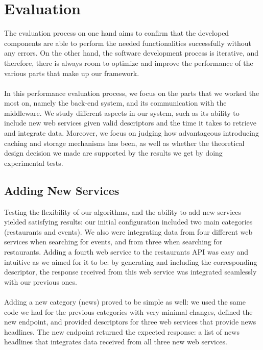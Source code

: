 \begin{itemize}
\end{itemize}
\pagebreak
\section{Evaluation}
The evaluation process on one hand aims to confirm that the developed components are able to perform the needed functionalities successfully without any errors. On the other hand, the software development process is iterative, and therefore, there is always room to optimize and improve the performance of the various parts that make up our framework.\\\\
In this performance evaluation process, we focus on the parts that we worked the most on, namely the back-end system, and its communication with the middleware. We study different aspects in our system, such as its ability to include new web services given valid descriptors and the time it takes to retrieve and integrate data. Moreover, we focus on judging how advantageous introducing caching and storage mechanisms has been, as well as whether the theoretical design decision we made are supported by the results we get by doing experimental tests.
\subsection{Adding New Services}
Testing the flexibility of our algorithms, and the ability to add new services yielded satisfying results: our initial configuration included two main categories (restaurants and events). We also were integrating data from four different web services when searching for events, and from three when searching for restaurants. Adding a fourth web service to the restaurants API was easy and intuitive as we aimed for it to be: by generating and including the corresponding descriptor, the response received from this web service was integrated seamlessly with our previous ones.\\\\
Adding a new category (news) proved to be simple as well: we used the same code we had for the previous categories with very minimal changes, defined the new endpoint, and provided descriptors for three web services that provide news headlines. The new endpoint returned the expected response: a list of news headlines that integrates data received from all three new web services.
